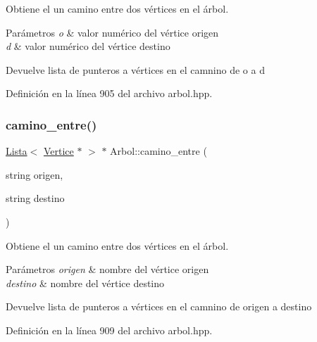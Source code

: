 Obtiene el un camino entre dos vértices en el árbol. 


\begin{DoxyParams}{Parámetros}
{\em o} & valor numérico del vértice origen \\
\hline
{\em d} & valor numérico del vértice destino \\
\hline
\end{DoxyParams}
\begin{DoxyReturn}{Devuelve}
lista de punteros a vértices en el camnino de o a d 
\end{DoxyReturn}


Definición en la línea 905 del archivo arbol.\+hpp.

\mbox{\label{classArbol_aef0f680828ac573af495b98d2eb09c12}} 
\subsubsection{\texorpdfstring{camino\+\_\+entre()}{camino\_entre()}\hspace{0.1cm}{\footnotesize\ttfamily [2/2]}}
{\footnotesize\ttfamily \hyperlink{classLista}{Lista}$<$ \hyperlink{classVertice}{Vertice} $\ast$ $>$ $\ast$ Arbol\+::camino\+\_\+entre (\begin{DoxyParamCaption}\item[{string}]{origen,  }\item[{string}]{destino }\end{DoxyParamCaption})}



Obtiene el un camino entre dos vértices en el árbol. 


\begin{DoxyParams}{Parámetros}
{\em origen} & nombre del vértice origen \\
\hline
{\em destino} & nombre del vértice destino \\
\hline
\end{DoxyParams}
\begin{DoxyReturn}{Devuelve}
lista de punteros a vértices en el camnino de origen a destino 
\end{DoxyReturn}


Definición en la línea 909 del archivo arbol.\+hpp.

\mbox{\label{classArbol_aba59969b2a10294fb79e583a8e9471c5}} 
